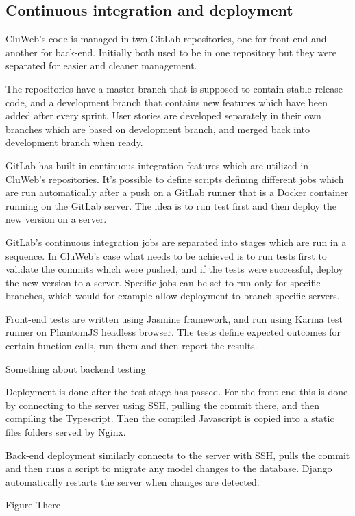 \subsection{Continuous integration and deployment}
CluWeb's code is managed in two GitLab repositories, one for front-end and another for back-end. Initially both used to be in one repository but they were separated for easier and cleaner management.

The repositories have a master branch that is supposed to contain stable release code, and a development branch that contains new features which have been added after every sprint. User stories are developed separately in their own branches which are based on development branch, and merged back into development branch when ready.

GitLab has built-in continuous integration features which are utilized in CluWeb's repositories. It's possible to define scripts defining different jobs which are run automatically after a push on a GitLab runner that is a Docker container running on the GitLab server. The idea is to run test first and then deploy the new version on a server.

GitLab's continuous integration jobs are separated into stages which are run in a sequence. In CluWeb's case what needs to be achieved is to run tests first to validate the commits which were pushed, and if the tests were successful, deploy the new version to a server. Specific jobs can be set to run only for specific branches, which would for example allow deployment to branch-specific servers.

Front-end tests are written using Jasmine framework, and run using Karma test runner on PhantomJS headless browser. The tests define expected outcomes for certain function calls, run them and then report the results.

Something about backend testing

Deployment is done after the test stage has passed. For the front-end this is done by connecting to the server using SSH, pulling the commit there, and then compiling the Typescript. Then the compiled Javascript is copied into a static files folders served by Nginx.

Back-end deployment similarly connects to the server with SSH, pulls the commit and then runs a script to migrate any model changes to the database. Django automatically restarts the server when changes are detected.

Figure There

